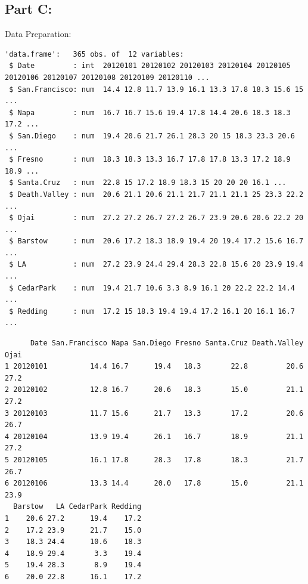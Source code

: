 \documentclass[
  11pt,
]{article}
\begin{document}
\subsection{Part C:}\label{part-c}

Data Preparation:

\begin{verbatim}
'data.frame':   365 obs. of  12 variables:
 $ Date         : int  20120101 20120102 20120103 20120104 20120105 20120106 20120107 20120108 20120109 20120110 ...
 $ San.Francisco: num  14.4 12.8 11.7 13.9 16.1 13.3 17.8 18.3 15.6 15 ...
 $ Napa         : num  16.7 16.7 15.6 19.4 17.8 14.4 20.6 18.3 18.3 17.2 ...
 $ San.Diego    : num  19.4 20.6 21.7 26.1 28.3 20 15 18.3 23.3 20.6 ...
 $ Fresno       : num  18.3 18.3 13.3 16.7 17.8 17.8 13.3 17.2 18.9 18.9 ...
 $ Santa.Cruz   : num  22.8 15 17.2 18.9 18.3 15 20 20 20 16.1 ...
 $ Death.Valley : num  20.6 21.1 20.6 21.1 21.7 21.1 21.1 25 23.3 22.2 ...
 $ Ojai         : num  27.2 27.2 26.7 27.2 26.7 23.9 20.6 20.6 22.2 20 ...
 $ Barstow      : num  20.6 17.2 18.3 18.9 19.4 20 19.4 17.2 15.6 16.7 ...
 $ LA           : num  27.2 23.9 24.4 29.4 28.3 22.8 15.6 20 23.9 19.4 ...
 $ CedarPark    : num  19.4 21.7 10.6 3.3 8.9 16.1 20 22.2 22.2 14.4 ...
 $ Redding      : num  17.2 15 18.3 19.4 19.4 17.2 16.1 20 16.1 16.7 ...
\end{verbatim}

\begin{verbatim}
      Date San.Francisco Napa San.Diego Fresno Santa.Cruz Death.Valley Ojai
1 20120101          14.4 16.7      19.4   18.3       22.8         20.6 27.2
2 20120102          12.8 16.7      20.6   18.3       15.0         21.1 27.2
3 20120103          11.7 15.6      21.7   13.3       17.2         20.6 26.7
4 20120104          13.9 19.4      26.1   16.7       18.9         21.1 27.2
5 20120105          16.1 17.8      28.3   17.8       18.3         21.7 26.7
6 20120106          13.3 14.4      20.0   17.8       15.0         21.1 23.9
  Barstow   LA CedarPark Redding
1    20.6 27.2      19.4    17.2
2    17.2 23.9      21.7    15.0
3    18.3 24.4      10.6    18.3
4    18.9 29.4       3.3    19.4
5    19.4 28.3       8.9    19.4
6    20.0 22.8      16.1    17.2
\end{verbatim}
\end{document}
